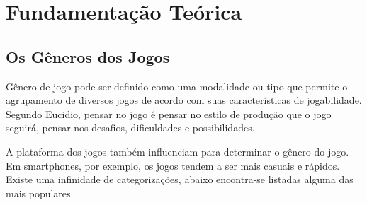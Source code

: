 \chapter{Fundamentação Teórica}
\label{cap:fundamentacao-teorica}


\section{Os Gêneros dos Jogos}
\label{sec:os-generos-dos-jogos}

Gênero de jogo pode ser definido como uma modalidade ou tipo que permite o agrupamento de diversos jogos de acordo com suas características de jogabilidade.
Segundo Eucidio, pensar no jogo é pensar no estilo de produção que o jogo seguirá, pensar nos desafios, dificuldades e possibilidades.

A plataforma dos jogos também influenciam para determinar o gênero do jogo. Em smartphones, por exemplo, os jogos tendem a ser mais casuais e rápidos. Existe uma infinidade de categorizações, abaixo encontra-se listadas alguma das mais populares. \cite{gen}

